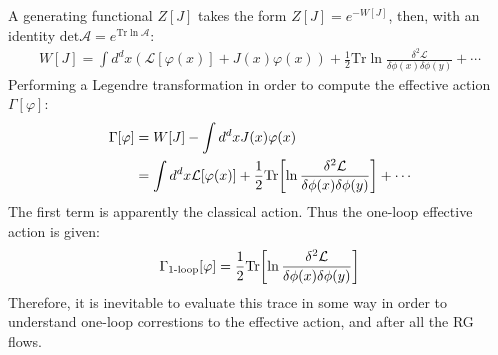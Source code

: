 A generating functional $Z[J]$ takes the form $Z[J] = e^{-W[J]}$, then, with an identity $\text{det} \mathcal{A} = e^{\text{Tr} \ln \mathcal{A}}$:
\begin{align}
    W[J] = \int d^{d}x (\mathcal {L} [\varphi (x)] + J(x) \varphi (x)) + \frac{1}{2} \text{Tr} \ln \frac{\delta ^{2} \mathcal{L}}{\delta \phi(x) \delta \phi(y)} + \cdots
\end{align}
Performing a Legendre transformation in order to compute the effective action $\Gamma[\varphi]$:
\begin{align}
    \Gamma[\varphi] &= W[J] - \int d^{d} x J(x)\varphi(x) \nonumber \\
    & = \int d^{d}x \mathcal{L} [\varphi(x)] + \frac{1}{2} \text{Tr} \qty[\ln \frac{\delta ^{2} \mathcal{L}}{\delta \phi(x) \delta \phi(y)}] + \cdots
\end{align}
The first term is apparently the classical action. Thus the one-loop effective action is given:
\begin{align}
    \label{eq:2.8}
    \Gamma_{\text{1-loop}} [\varphi] = \frac{1}{2} \text{Tr} \qty[\ln \frac{\delta ^{2} \mathcal{L}}{\delta \phi(x) \delta \phi(y)}]
\end{align}
Therefore, it is inevitable to evaluate this trace in some way in order to understand one-loop correstions to the effective action, and after all the RG flows.

